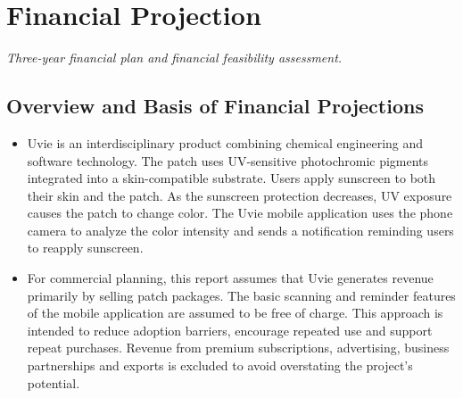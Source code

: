 \section{Financial Projection}\label{sec:financial}
\emph{Three-year financial plan and financial feasibility assessment.}

\subsection{Overview and Basis of Financial Projections}
\begin{itemize}[itemsep=0pt]
  \item Uvie is an interdisciplinary product combining chemical engineering and
    software technology. The patch uses UV-sensitive photochromic pigments
    integrated into a skin-compatible substrate. Users apply sunscreen to both
    their skin and the patch. As the sunscreen protection decreases, UV exposure
    causes the patch to change color. The Uvie mobile application uses the phone
    camera to analyze the color intensity and sends a notification reminding
    users to reapply sunscreen.
  \item For commercial planning, this report assumes that Uvie generates revenue
    primarily by selling patch packages. The basic scanning and reminder
    features of the mobile application are assumed to be free of charge. This
    approach is intended to reduce adoption barriers, encourage repeated use and
    support repeat purchases. Revenue from premium subscriptions, advertising,
    business partnerships and exports is excluded to avoid overstating the
    project's potential.
\end{itemize}


